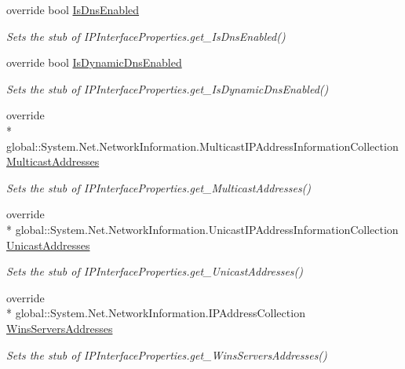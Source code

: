 \begin{DoxyCompactItemize}
override bool \hyperlink{class_system_1_1_net_1_1_network_information_1_1_fakes_1_1_stub_i_p_interface_properties_a005a5729f457162cfe461e42edf97bfd}{Is\-Dns\-Enabled}
\begin{DoxyCompactList}\small\item\em Sets the stub of I\-P\-Interface\-Properties.\-get\-\_\-\-Is\-Dns\-Enabled()\end{DoxyCompactList}\item 
override bool \hyperlink{class_system_1_1_net_1_1_network_information_1_1_fakes_1_1_stub_i_p_interface_properties_a08518210a4b55c8647318da7350afc5d}{Is\-Dynamic\-Dns\-Enabled}
\begin{DoxyCompactList}\small\item\em Sets the stub of I\-P\-Interface\-Properties.\-get\-\_\-\-Is\-Dynamic\-Dns\-Enabled()\end{DoxyCompactList}\item 
override \\*
global\-::\-System.\-Net.\-Network\-Information.\-Multicast\-I\-P\-Address\-Information\-Collection \hyperlink{class_system_1_1_net_1_1_network_information_1_1_fakes_1_1_stub_i_p_interface_properties_aa35cb9592d0f606b3e5af11447fee7ad}{Multicast\-Addresses}
\begin{DoxyCompactList}\small\item\em Sets the stub of I\-P\-Interface\-Properties.\-get\-\_\-\-Multicast\-Addresses()\end{DoxyCompactList}\item 
override \\*
global\-::\-System.\-Net.\-Network\-Information.\-Unicast\-I\-P\-Address\-Information\-Collection \hyperlink{class_system_1_1_net_1_1_network_information_1_1_fakes_1_1_stub_i_p_interface_properties_a1c6ccf0331a821e408e6ca8cd383f1aa}{Unicast\-Addresses}
\begin{DoxyCompactList}\small\item\em Sets the stub of I\-P\-Interface\-Properties.\-get\-\_\-\-Unicast\-Addresses()\end{DoxyCompactList}\item 
override \\*
global\-::\-System.\-Net.\-Network\-Information.\-I\-P\-Address\-Collection \hyperlink{class_system_1_1_net_1_1_network_information_1_1_fakes_1_1_stub_i_p_interface_properties_a205039c32a3b98ed6ba7ea3c01d39517}{Wins\-Servers\-Addresses}
\begin{DoxyCompactList}\small\item\em Sets the stub of I\-P\-Interface\-Properties.\-get\-\_\-\-Wins\-Servers\-Addresses()\end{DoxyCompactList}\end{DoxyCompactItemize}



